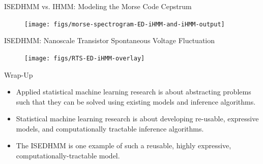 \documentclass[xcolor=dvipsnames]{beamer}
\begin{document}
\begin{frame}[t]{ISEDHMM vs. IHMM:  Modeling the Morse Code Cepstrum}
	\begin{figure}[t]
		\begin{center}
			\texttt{[image: figs/morse-spectrogram-ED-iHMM-and-iHMM-output]}
		\end{center}
	\end{figure}
\end{frame}


\begin{frame}[t]{ISEDHMM: Nanoscale Transistor Spontaneous Voltage Fluctuation}
	\begin{figure}[t]
		\begin{center}
			\texttt{[image: figs/RTS-ED-iHMM-overlay]}
		\end{center}
	\end{figure}
\end{frame}

\begin{frame}[t]{Wrap-Up}
\begin{itemize}
\item Applied statistical machine learning research is about abstracting problems such that they can be solved using existing models and inference algorithms.
\item Statistical machine learning research is about developing re-usable, expressive models, and computationally tractable inference algorithms.
\item The ISEDHMM is one example of such a reusable, highly expressive, computationally-tractable model.
\end{itemize}
\end{frame}

\end{document}
